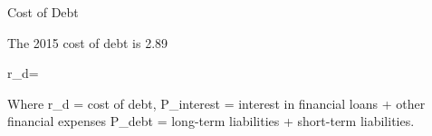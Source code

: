 Cost of Debt

The 2015 cost of debt is 2.89~%

r_{d}=

Where r_{d} = cost of debt,  
P_{interest} = interest in financial loans + other financial expenses 
P_{debt} = long-term liabilities + short-term liabilities.
